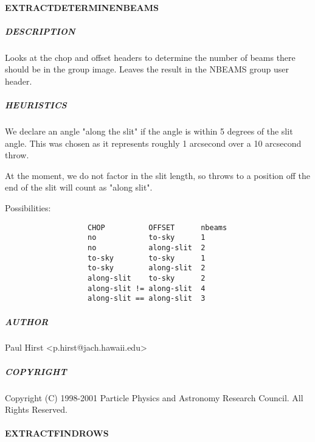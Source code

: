 \documentclass[twoside,11pt]{article}
\renewcommand{\_}{\texttt{\symbol{95}}}
\begin{document}
\paragraph*{\_EXTRACT\_DETERMINE\_NBEAMS\_\label{_EXTRACT_DETERMINE_NBEAMS_}}



\subparagraph*{DESCRIPTION\label{_EXTRACT_DETERMINE_NBEAMS__DESCRIPTION}}

Looks at the chop and offset headers to determine the number of beams
there should be in the group image. Leaves the result in the NBEAMS
group user header.

\subparagraph*{HEURISTICS\label{_EXTRACT_DETERMINE_NBEAMS__HEURISTICS}}

We declare an angle "along the slit" if the angle is within 5 degrees
of the slit angle. This was chosen as it represents roughly 1
arcsecond over a 10 arcsecond throw.



At the moment, we do not factor in the slit length, so throws to a
position off the end of the slit will count as "along slit".



Possibilities:

\begin{verbatim}
                   CHOP          OFFSET      nbeams
                   no            to-sky      1
                   no            along-slit  2
                   to-sky        to-sky      1
                   to-sky        along-slit  2
                   along-slit    to-sky      2
                   along-slit != along-slit  4
                   along-slit == along-slit  3
\end{verbatim}
\subparagraph*{AUTHOR\label{_EXTRACT_DETERMINE_NBEAMS__AUTHOR}}

Paul Hirst <p.hirst@jach.hawaii.edu>

\subparagraph*{COPYRIGHT\label{_EXTRACT_DETERMINE_NBEAMS__COPYRIGHT}}

Copyright (C) 1998-2001 Particle Physics and Astronomy Research
Council. All Rights Reserved.

\paragraph*{\_EXTRACT\_FIND\_ROWS\_\label{_EXTRACT_FIND_ROWS_}}
\end{document}
